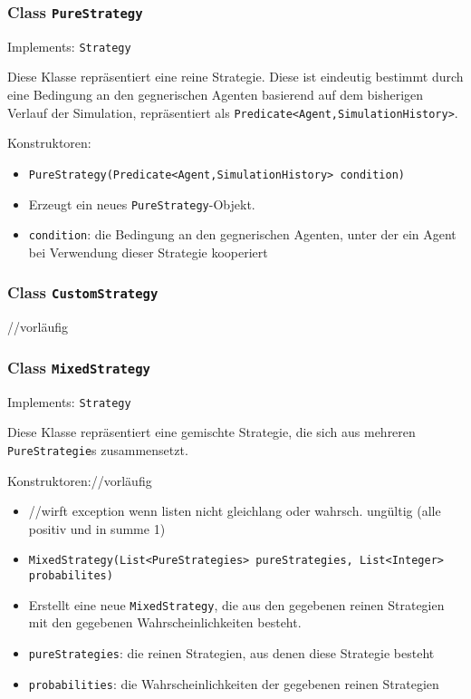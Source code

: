 \documentclass[parskip=full,11pt]{scrartcl}
\begin{document}
\subsubsection{Class \texttt{PureStrategy}}
Implements: \texttt{Strategy}

Diese Klasse repräsentiert eine reine Strategie. Diese ist eindeutig bestimmt durch eine Bedingung an den gegnerischen Agenten basierend auf dem bisherigen Verlauf der Simulation, repräsentiert als \texttt{Predicate<Agent,SimulationHistory>}.

Konstruktoren:
\begin{itemize}\itemsep -10pt
\item \texttt{PureStrategy(Predicate<Agent,SimulationHistory> condition)}
\item[] Erzeugt ein neues \texttt{PureStrategy}-Objekt.
\item[] \texttt{condition}: die Bedingung an den gegnerischen Agenten, unter der ein Agent bei Verwendung dieser Strategie kooperiert
\end{itemize}

\subsubsection{Class \texttt{CustomStrategy}}
//vorläufig

\subsubsection{Class \texttt{MixedStrategy}}
Implements: \texttt{Strategy}

Diese Klasse repräsentiert eine gemischte Strategie, die sich aus mehreren \texttt{PureStrategie}s zusammensetzt.

Konstruktoren://vorläufig
\begin{itemize}\itemsep -10pt
\item[] //wirft exception wenn listen nicht gleichlang oder wahrsch. ungültig (alle positiv und in summe 1)
\item \texttt{MixedStrategy(List<PureStrategies> pureStrategies, List<Integer> probabilites)}
\item[] Erstellt eine neue \texttt{MixedStrategy}, die aus den gegebenen reinen Strategien mit den gegebenen Wahrscheinlichkeiten besteht.
\item[] \texttt{pureStrategies}: die reinen Strategien, aus denen diese Strategie besteht
\item[] \texttt{probabilities}: die Wahrscheinlichkeiten der gegebenen reinen Strategien
\end{itemize}
\end{document}
